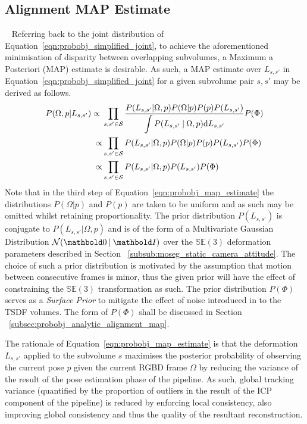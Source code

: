 \subsection{Alignment MAP Estimate}
~\label{subsec:probobj_alignment_map}
Referring back to the joint distribution of Equation~\ref{eqn:probobj_simplified_joint}, 
to achieve the aforementioned minimisation of disparity between overlapping subvolumes, 
a Maximum a Posteriori (MAP) estimate is desirable. As such, a MAP estimate over \(L_{s, s'}\) 
in Equation~\ref{eqn:probobj_simplified_joint} for a given subvolume pair \(s, s'\) may be
derived as follows.
\begin{align}
  \label{eqn:probobj_map_estimate}
  P(\Omega, p | L_{s, s'}) \propto{}& \prod_{s, s' \in \mathcal{S}}
  \frac{P(L_{s, s'} | \Omega, p) 
  P(\Omega | p)P(p)P(L_{s, s'})}
  {\displaystyle\int P(L_{s, s'} \:\vert\: \Omega, p)
  {\mathrm d{L_{s, s'}}}} P(\Phi) \\
  \propto& \prod_{s, s' \in \mathcal{S}} P(L_{s, s'} | \Omega, p) P(\Omega | p)
  P(p)P(L_{s, s'})P(\Phi) \\
  \propto& \prod_{s, s' \in \mathcal{S}} P(L_{s, s'} | \Omega, p)P(L_{s, s'})
  P(\Phi)
\end{align}
Note that in the third step of Equation~\ref{eqn:probobj_map_estimate} the
distributions \(P(\Omega | p)\) and \(P(p)\) are taken to be uniform and as such may
be omitted whilst retaining proportionality. The prior distribution \(P(L_{s, s'})\) is
conjugate to \(P(L_{s, s'} | \Omega, p)\) and is of the form of a Multivariate
Gaussian Distribution \(\mathcal{N}(\bm{0} \given \bm{I})\) over the
\(\mathbb{SE}(3)\) deformation parameters described in Section 
~\ref{subsub:moseg_static_camera_attitude}. The choice of such a prior distribution
is motivated by the assumption that motion between consecutive frames is minor,
thus the given prior will have the effect of constraining the \(\mathbb{SE}(3)\)
transformation as such. The prior distribution \(P(\Phi)\) serves as a
\textit{Surface Prior} to mitigate the effect of noise introduced in to the TSDF
volumes. The form of \(P(\Phi)\) shall be discussed in Section
~\ref{subsec:probobj_analytic_alignment_map}.

The rationale of Equation~\ref{eqn:probobj_map_estimate} is that the deformation
\(L_{s, s'}\) applied to the subvolume \(s\) maximises the posterior probability of
observing the current pose \(p\) given the current RGBD frame \( \Omega \) by reducing
the variance of the result of the pose estimation phase of the pipeline. As such,
global tracking variance (quantified by the proportion of outliers in the result
of the ICP component of the pipeline) is reduced by enforcing local consistency,
also improving global consistency and thus the quality of the resultant
reconstruction.

